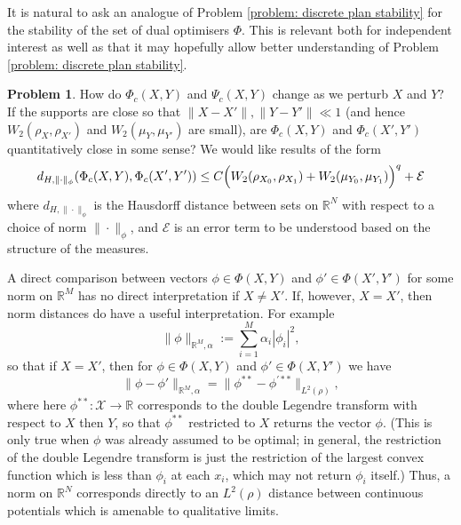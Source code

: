 \documentclass[11pt, oneside, titlepage]{book}
\theoremstyle{plain}
\theoremstyle{definition}
\newtheorem{problem}{Problem}
\newcommand{\R}{\mathbb{R}}
\newcommand{\X}{\mathcal{X}}
\begin{document}
It is natural to ask an analogue of Problem \ref{problem: discrete plan stability} for the stability of the set of dual optimisers $\Phi$. This is relevant both for independent interest as well as that it may hopefully allow better understanding of Problem \ref{problem: discrete plan stability}.
\begin{problem}
    \label{problem: discrete potential stability}
    How do $\Phi_c(X, Y)$ and $\Psi_c(X, Y)$ change as we perturb $X$ and $Y$? If the supports are close so that $\|X - X'\|, \|Y - Y'\| \ll 1$ (and hence $W_2(\rho_X, \rho_{X'})$ and $W_2(\mu_Y, \mu_{Y'})$ are small), are $\Phi_c(X, Y)$ and $\Phi_c(X', Y')$ quantitatively close in some sense? We would like results of the form
\begin{equation}
\label{eq: stability of potentials discrete goal statement}
    d_{H, \|\cdot\|_\phi}(\Phi_c(X, Y), \Phi_c(X', Y')) \leq C \Bigl(W_2(\rho_{X_0}, \rho_{X_1}) + W_2(\mu_{Y_0}, \mu_{Y_1}) \Bigr)^q + \mathcal{E}
\end{equation}
where $d_{H, \|\cdot\|_\phi}$ is the Hausdorff distance between sets on $\R^N$ with respect to a choice of norm $\| \cdot \|_\phi$, and $\mathcal{E}$ is an error term to be understood based on the structure of the measures.
\end{problem}

A direct comparison between vectors $\phi \in \Phi(X, Y)$ and $\phi' \in \Phi(X', Y')$ for some norm on $\R^M$ has no direct interpretation if $X \neq X'$. If, however, $X = X'$, then norm distances do have a useful interpretation. For example
\begin{equation*}
    \| \phi \|_{\R^M, \alpha} := \sum_{i=1}^M \alpha_i |\phi_i|^2,
\end{equation*}
so that if $X = X'$, then for $\phi \in \Phi(X, Y)$ and $\phi' \in \Phi(X, Y')$ we have
\begin{equation*}
    \|\phi - \phi'\|_{\R^M, \alpha} = \|\phi^{**} - \phi^{'**}\|_{L^2(\rho)},
\end{equation*}
where here $\phi^{**}: \X \to \R$ corresponds to the double Legendre transform with respect to $X$ then $Y$, so that $\phi^{**}$ restricted to $X$ returns the vector $\phi$. (This is only true when $\phi$ was already assumed to be optimal; in general, the restriction of the double Legendre transform is just the restriction of the largest convex function which is less than $\phi_i$ at each $x_i$, which may not return $\phi_i$ itself.) Thus, a norm on $\R^N$ corresponds directly to an $L^2(\rho)$ distance between continuous potentials which is amenable to qualitative limits.
\end{document}
